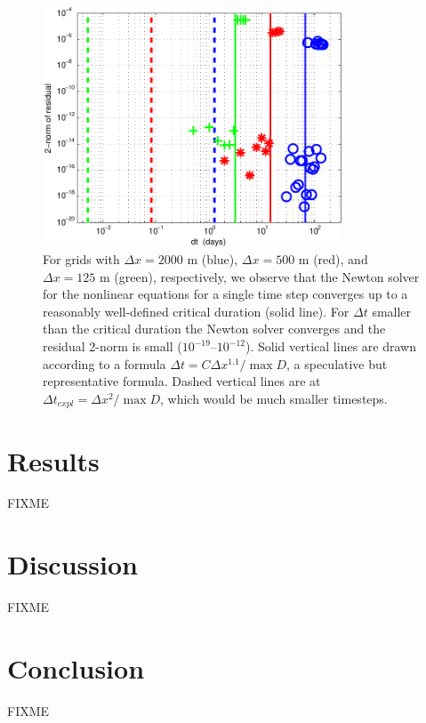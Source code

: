 \documentclass[11pt]{amsart}
\begin{document}
\begin{figure}[ht]
\centering
\includegraphics[width=3.5in,keepaspectratio=true]{figs/criticalconverge}
\caption{For grids with $\Delta x=2000$ m (blue), $\Delta x=500$ m (red), and $\Delta x=125$ m (green), respectively, we observe that the Newton solver for the nonlinear equations for a single time step converges up to a reasonably well-defined critical duration (solid line).  For $\Delta t$ smaller than the critical duration the Newton solver converges and the residual 2-norm is small ($10^{-19}$--$10^{-12}$).  Solid vertical lines are drawn according to a formula $\Delta t = C \Delta x^{1.1} / \max D$, a speculative but representative formula.  Dashed vertical lines are at $\Delta t_{expl}=\Delta x^2/\max D$, which would be much smaller timesteps.}
\label{fig:criticalconverge}
\end{figure}


\section{Results}

FIXME


\section{Discussion}

FIXME


\section{Conclusion}

FIXME


\small

\normalsize


\appendix
\end{document}
